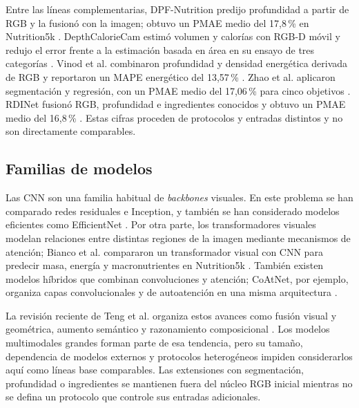 Entre las líneas complementarias, DPF-Nutrition predijo profundidad a partir de
RGB y la fusionó con la imagen; obtuvo un PMAE medio del 17,8\,\% en Nutrition5k
\citep{hanDPFNutritionFoodNutrition2023}. DepthCalorieCam estimó volumen y
calorías con RGB-D móvil y redujo el error frente a la estimación basada en área
en su ensayo de tres categorías \citep{andoDepthCalorieCamMobileApplication2019}.
Vinod et al. combinaron profundidad y densidad energética derivada de RGB y
reportaron un MAPE energético del 13,57\,\% \citep{vinodImageBasedFood2022a}.
Zhao et al. aplicaron segmentación y regresión, con un PMAE medio del 17,06\,\%
para cinco objetivos \citep{zhaoVisualNutritionAnalysis2024}. RDINet fusionó
RGB, profundidad e ingredientes conocidos y obtuvo un PMAE medio del 16,8\,\%
\citep{kuangRDINetDeepLearning2026}. Estas cifras proceden de protocolos y
entradas distintos y no son directamente comparables.

\subsection{Familias de modelos}

Las CNN son una
familia habitual de \emph{backbones} visuales. En este problema se han comparado
redes residuales e Inception, y también se han considerado modelos eficientes
como EfficientNet \citep{bianco2DPredictionNutritional2025,yanuartantiDeepLearningModel2025a}.
Por otra parte, los transformadores visuales modelan relaciones entre distintas
regiones de la imagen mediante mecanismos de atención; Bianco et al.
compararon un transformador visual con CNN para predecir masa, energía y
macronutrientes en Nutrition5k \citep{bianco2DPredictionNutritional2025}.
También existen modelos híbridos que combinan convoluciones y atención; CoAtNet,
por ejemplo, organiza capas convolucionales y de autoatención en una misma
arquitectura \citep{daiCoAtNetMarryingConvolution2021}.

La revisión reciente de Teng et al. organiza estos avances como fusión visual y
geométrica, aumento semántico y razonamiento composicional
\citep{tengMultimodalInformationFusion2027}. Los modelos multimodales grandes
forman parte de esa tendencia, pero su tamaño, dependencia de modelos externos y
protocolos heterogéneos impiden considerarlos aquí como líneas base comparables.
Las extensiones con segmentación, profundidad o ingredientes se mantienen fuera
del núcleo RGB inicial mientras no se defina un protocolo que controle sus
entradas adicionales.

